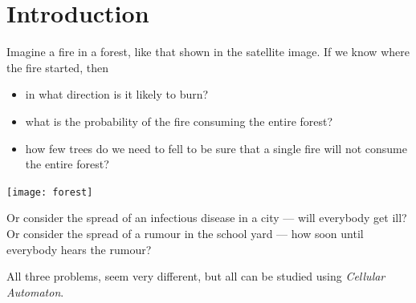 \documentclass{coderdojo}
\begin{document}
\maketitle

\section*{Introduction}

\begin{minipage}{.5\textwidth}
Imagine a fire in a forest, like that shown in the satellite image. If we know where the fire started, then
\begin{itemize}
\item in what direction is it likely to burn?
\item what is the probability of the fire consuming the entire forest?
\item how few trees do we need to fell to be sure that a single fire will not  consume the entire forest?
\end{itemize}
\end{minipage}
\begin{minipage}{.48\textwidth}\centering
\texttt{[image: forest]}
\end{minipage}

\vspace{3pt}
Or consider the spread of an infectious disease in a city --- will everybody get ill?
Or consider the spread of a rumour in the school yard --- how soon until everybody hears the rumour?

\vspace{6pt}
All three problems, seem very different, but all can be studied using {\em Cellular Automaton}.
\end{document}
